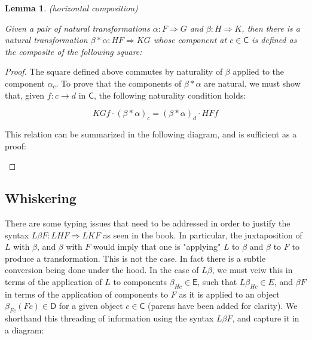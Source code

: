\documentclass[10pt, oneside]{article}   	%
\newcommand{\cat}[1]{\mathsf{#1}}
\newcommand{\cc}{\cat{C}}
\newcommand{\dd}{\cat{D}}
\newcommand{\ee}{\cat{E}}
\newcommand{\nt}{\Rightarrow}
\newcommand{\at}{\alpha}
\newcommand{\bt}{\beta}
\newtheorem{lemma}[theorem]{Lemma}
\begin{document}
\begin{lemma}(horizontal composition)

Given a pair of natural transformations $\at : F \nt G$ and $\bt : H \nt K$, then there is a natural transformation $\bt * \at : HF \nt KG$ whose component at $c \in \cc$ is defined as the composite of the following square: 

\begin{center}
\end{center}
\end{lemma}

\begin{proof}
	The square defined above commutes by naturality of $\bt$ applied to the component $\alpha_c$. To prove that the components of $\bt * \at$ are natural, we must show that, given $f: c \to d$ in $\cc$, the following naturality condition holds: 

\begin{equation}
  KGf \cdot (\bt * \at)_c = (\bt * \at)_d \cdot HFf
\end{equation}

This relation can be summarized in the following diagram, and is sufficient as a proof: 

\begin{center}
\end{center}
\end{proof}

\subsection{Whiskering}

There are some typing issues that need to be addressed in order to justify the syntax $L\bt F : LHF \nt LKF$ as seen in the book. In particular, the juxtaposition of $L$ with $\bt$, and $\bt$ with $F$ would imply that one is "applying" $L$ to $\bt$ and $\bt$ to $F$ to produce a transformation. This is not the case. In fact there is a subtle conversion being done under the hood. In the case of $L \bt$, we must veiw this in terms of the application of $L$ to components $\bt_{Hc} \in \ee$, such that $L\bt_{Hc} \in E$, and $\bt F$ in terms of the application of components to $F$ as it is applied to an object $\bt_{Fc}(Fc) \in \dd$ for a given object $c \in \cc$ (parens have been added for clarity). We shorthand this threading of information using the syntax $L\bt F$, and capture it in a diagram: 
\end{document}
